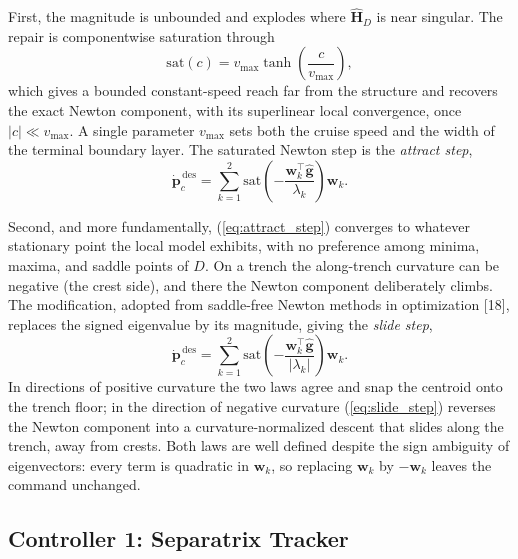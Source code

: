 \documentclass[lettersize,journal]{IEEEtran}
\begin{document}
First, the magnitude is unbounded and explodes where
$\hat{\mathbf{H}}_D$ is near singular. The repair is componentwise
saturation through
\begin{equation}
    \mathrm{sat}(c) = v_{\max} \tanh\!\left(\frac{c}{v_{\max}}\right),
    \label{eq:sat}
\end{equation}
which gives a bounded constant-speed reach far from the structure and
recovers the exact Newton component, with its superlinear local
convergence, once $|c| \ll v_{\max}$. A single parameter $v_{\max}$
sets both the cruise speed and the width of the terminal boundary
layer. The saturated Newton step is the \emph{attract step},
\begin{equation}
    \dot{\mathbf{p}}_c^{\,\text{des}} = \sum_{k=1}^{2}
    \mathrm{sat}\!\left(-\frac{\mathbf{w}_k^\top
    \hat{\mathbf{g}}}{\lambda_k}\right)\mathbf{w}_k.
    \label{eq:attract_step}
\end{equation}

Second, and more fundamentally, (\ref{eq:attract_step}) converges to
whatever stationary point the local model exhibits, with no preference
among minima, maxima, and saddle points of $D$. On a trench the
along-trench curvature can be negative (the crest side), and there the
Newton component deliberately climbs. The modification, adopted from
saddle-free Newton methods in optimization [18], replaces the signed
eigenvalue by its magnitude, giving the \emph{slide step},
\begin{equation}
    \dot{\mathbf{p}}_c^{\,\text{des}} = \sum_{k=1}^{2}
    \mathrm{sat}\!\left(-\frac{\mathbf{w}_k^\top
    \hat{\mathbf{g}}}{|\lambda_k|}\right)\mathbf{w}_k.
    \label{eq:slide_step}
\end{equation}
In directions of positive curvature the two laws agree and snap the
centroid onto the trench floor; in the direction of negative curvature
(\ref{eq:slide_step}) reverses the Newton component into a
curvature-normalized descent that slides along the trench, away from
crests. Both laws are well defined despite the sign ambiguity of
eigenvectors: every term is quadratic in $\mathbf{w}_k$, so replacing
$\mathbf{w}_k$ by $-\mathbf{w}_k$ leaves the command unchanged.

\subsection{Controller 1: Separatrix Tracker}
\label{sec:sep_controller}
\end{document}
